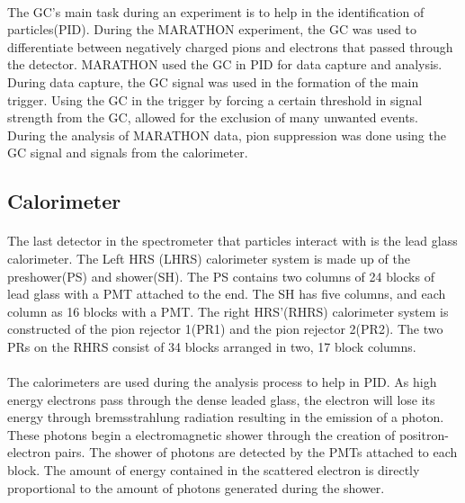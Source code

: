 	\paragraph{}The GC's main task during an experiment is to help in the identification of particles(PID). During the MARATHON experiment, the GC was used to differentiate between negatively charged pions and electrons that passed through the detector. MARATHON used the GC in PID for data capture and analysis. During data capture, the GC signal was used in the formation of the main trigger. Using the GC in the trigger by forcing a certain threshold in signal strength from the GC, allowed for the exclusion of many unwanted events. During the analysis of MARATHON data, pion suppression was done using the GC signal and signals from the calorimeter.   
	\subsection{Calorimeter}\label{sec:Cal}
	\paragraph{}The last detector in the spectrometer that particles interact with is the lead glass calorimeter. The Left HRS (LHRS) calorimeter system is made up of the preshower(PS) and shower(SH). The PS contains two columns of 24 blocks of lead glass with a PMT attached to the end. The SH has five columns, and each column as 16 blocks with a PMT. The right HRS'(RHRS) calorimeter system is constructed of the pion rejector 1(PR1) and the pion rejector 2(PR2). The two PRs on the RHRS consist of 34 blocks arranged in two, 17 block columns. 
	\paragraph{}The calorimeters are used during the analysis process to help in PID. As high energy electrons pass through the dense leaded glass, the electron will lose its energy through bremsstrahlung radiation resulting in the emission of a photon. These photons begin a electromagnetic shower through the creation of positron-electron pairs. The shower of photons are detected by the PMTs attached to each block. The amount of energy contained in the scattered electron is directly proportional to the amount of photons generated during the shower.

